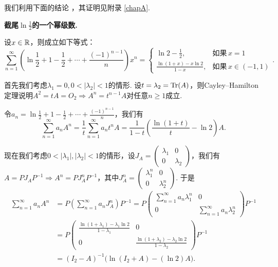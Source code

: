 \begin{solution}
  我们利用下面的结论 \cite{32}，其证明见附录 \ref{chapA}.
  \begin{mybox}
    {\bfseries 截尾$\ln\frac12$的一个幂级数.}

    设$x\in\mathbb R$，则成立如下等式：
    \[
      \sum_{n=1}^\infty \left( \ln\frac12 + 1 - \frac12 + \cdots + \frac{(-1)^{n-1}}n \right)x^n =
      \begin{cases}
        \ln2 - \frac12, & \text{如果}\, x = 1 \\
        \frac{\ln(1+x)-x\ln2}{1-x}, & \text{如果}\, x\in(-1,1)
      \end{cases}.
    \]
  \end{mybox}

  首先我们考虑$\lambda_1=0,0<|\lambda_2|<1$的情形. 设$t=\lambda_2=\operatorname{Tr}(A)$，则Cayley--Hamilton定理说明$A^2=tA=O_2\Rightarrow A^n=t^{n-1}A$对任意$n\ge1$成立.

  令$a_n=\ln\frac12 + 1 - \frac12 + \cdots + \frac{(-1)^{n-1}}n$，我们有
  \[
    \sum_{n=1}^\infty a_nA^n = \frac1t\sum_{n=1}^\infty a_nt^nA = \frac1{1-t} \left( \frac{\ln(1+t)}t - \ln2 \right)A.
  \]

  现在我们考虑$0<|\lambda_1|,|\lambda_2|<1$的情形，设$J_A=\begin{pmatrix}
    \lambda_1 & 0 \\
    0 & \lambda_2
  \end{pmatrix}$，我们有$A=PJ_AP^{-1}\Rightarrow A^n=PJ_A^nP^{-1}$，其中$J_A^n=\begin{pmatrix}
    \lambda_1^n & 0 \\
    0 & \lambda_2^n
  \end{pmatrix}$. 于是
  \begin{align*}
    \sum_{n=1}^\infty a_nA^n & = P \left( \sum_{n=1}^\infty a_nJ_A^n \right) P^{-1} = P
    \begin{pmatrix}
      \sum_{n=1}^\infty a_n\lambda_1^n & 0 \\
      0 & \sum_{n=1}^\infty a_n\lambda_2^n
    \end{pmatrix} P^{-1} \\
    & = P \begin{pmatrix}
      \frac{\ln(1+\lambda_1)-\lambda_1\ln2}{1-\lambda_1}
      & 0 \\
      0 & \frac{\ln(1+\lambda_2)-\lambda_2\ln2}{1-\lambda_2}
    \end{pmatrix} P^{-1} \\
    & = (I_2-A)^{-1}\big( \ln(I_2+A) - (\ln2)A \big).
  \end{align*}


\end{solution}
